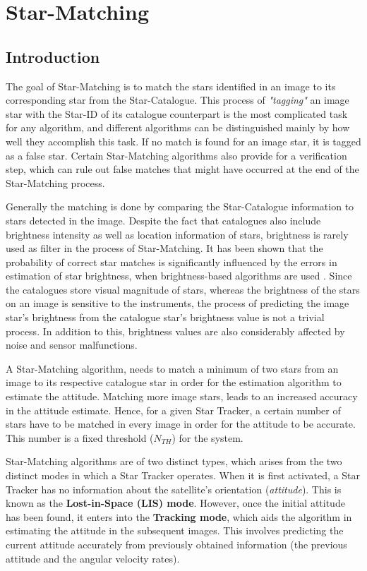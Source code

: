 \documentclass[../../main.tex]{subfiles}
\begin{document}
\section{Star-Matching}

\subsection{Introduction}

The goal of Star-Matching is to match the stars identified in an image to its corresponding star from the Star-Catalogue. This process of \textit{"tagging"} an image star with the Star-ID of its catalogue counterpart is the most complicated task for
any algorithm, and different algorithms can be distinguished mainly by how well they accomplish this task. 
If no match is found for an image star, it is tagged as a false star. Certain Star-Matching algorithms also provide for a verification step, which can rule out false matches that might have occurred at the end of the Star-Matching process.

Generally the matching is done by comparing the Star-Catalogue information to stars detected in the image. Despite the fact that catalogues also include brightness intensity as well as location information of stars, brightness is rarely used as filter in the process of Star-Matching. It has been shown that the probability of correct star matches is significantly influenced by the errors in estimation of star brightness, when brightness-based algorithms are used \cite{accardo2002brightness}.
Since the catalogues store visual magnitude of stars, whereas the brightness of the stars on an image is sensitive to the instruments, the process of predicting the image star's brightness from the catalogue star's brightness value is not a trivial process. In addition to this, brightness values are also considerably affected by noise and sensor malfunctions.

A Star-Matching algorithm, needs to match a minimum of two stars from an image to its respective catalogue star in order for the estimation algorithm to estimate the attitude. 
Matching more image stars, leads to an increased accuracy in the attitude estimate. Hence, for a given Star Tracker, a certain number of stars have to be matched in every image in order for the attitude to be accurate. This number is a fixed threshold ($N_{TH}$) for the system.

Star-Matching algorithms are of two distinct types, which arises from the two distinct modes in which a Star Tracker operates.
When it is first activated, a Star Tracker has no information about the satellite’s orientation (\textit{attitude}). This is known as the \textbf{Lost-in-Space (LIS) mode}. However, once the initial attitude has been found, it enters into the \textbf{Tracking mode}, which aids the algorithm in
estimating the attitude in the subsequent images. This involves predicting the current attitude accurately from
previously obtained information (the previous attitude and the angular velocity rates).
\end{document}
